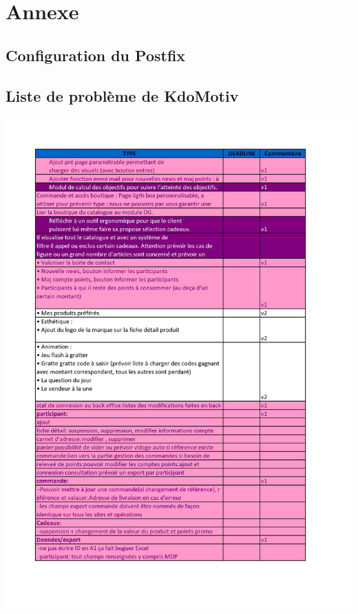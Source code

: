 \chapter{Annexe}

\section*{Configuration du Postfix}



\newpage
\section*{Liste de problème de KdoMotiv}
\centering
\includegraphics[width=17cm]{appendix/listing-problemes-web.JPG}
\centering
